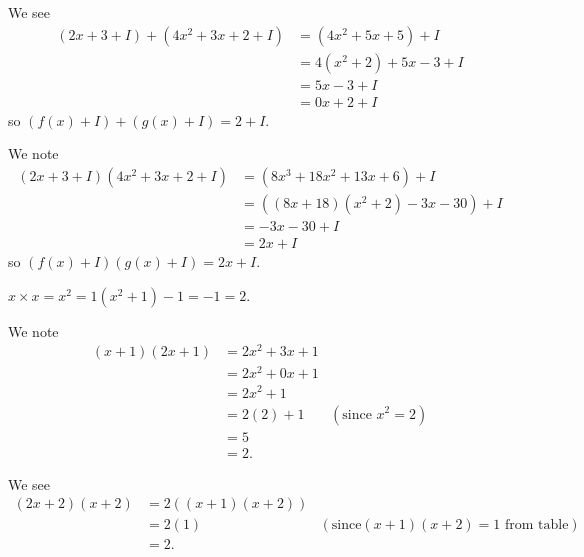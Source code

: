 \begin{questions}
\begin{partquestions}{\roman*}
        \item \begin{partquestions}{\alph*}
            \item We see
            \begin{align*}
                \left(2x+3 + I\right) + \left(4x^2+3x+2 + I\right) &= (4x^2+5x+5) + I\\
                &= 4(x^2+2) + 5x - 3 + I\\
                &= 5x - 3 + I\\
                &= 0x + 2 + I
            \end{align*}
            so $(f(x) + I) + (g(x) + I) = 2 + I$.

            \item We note
            \begin{align*}
                (2x+3 + I)(4x^2+3x+2 + I) &= (8 x^3 + 18 x^2 + 13 x + 6) + I\\
                &= \left((8x + 18)(x^2+2) - 3x - 30\right) + I\\
                &= -3x - 30 + I\\
                &= 2x + I
            \end{align*}
            so $(f(x) + I)(g(x) + I) = 2x + I$.
        \end{partquestions}
    \end{partquestions}

    \item \begin{partquestions}{\alph*}
        \item $x \times x = x^2 = 1(x^2+1) - 1 = -1 = 2$.

        \item We note
        \begin{align*}
            (x+1)(2x+1) &= 2x^2 + 3x + 1\\
            &= 2x^2 + 0x + 1\\
            &= 2x^2 + 1\\
            &= 2(2) + 1 & (\text{since } x^2 = 2)\\
            &= 5\\
            &= 2.
        \end{align*}

        \item We see
        \begin{align*}
            (2x+2)(x+2) &= 2\left((x+1)(x+2)\right)\\
            &= 2(1) & (\text{since} (x+1)(x+2) = 1 \text{ from table})\\
            &= 2.
        \end{align*}


\end{partquestions}
\end{questions}

